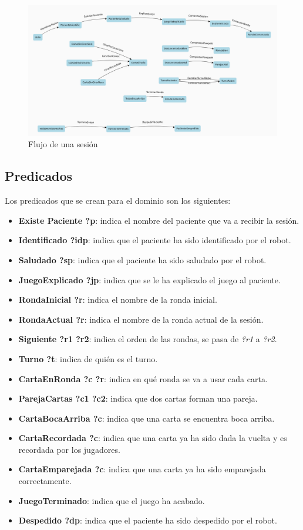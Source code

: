 \documentclass{uc3mpracticas}
\begin{document}
  \begin{figure}[!h]
    \centering
    \includegraphics[width=1.1\linewidth]{./Images/flujo.png}
    \caption*{Flujo de una sesión}
  \end{figure}



  \subsection{Predicados}

  Los predicados que se crean para el dominio son los siguientes:

  \begin{itemize}
    \item \textbf{Existe Paciente ?p}: indica el nombre del paciente que va a recibir la sesión.
    \item \textbf{Identificado ?idp}: indica que el paciente ha sido identificado por el robot.
    \item \textbf{Saludado ?sp}: indica que el paciente ha sido saludado por el robot.
    \item \textbf{JuegoExplicado ?jp}: indica que se le ha explicado el juego al paciente.
    \item \textbf{RondaInicial ?r}: indica el nombre de la ronda inicial.
    \item \textbf{RondaActual ?r}: indica el nombre de la ronda actual de la sesión.
    \item \textbf{Siguiente ?r1 ?r2}: indica el orden de las rondas, se pasa de \textit{?r1} a \textit{?r2}.
    \item \textbf{Turno ?t}: indica de quién es el turno.
    \item \textbf{CartaEnRonda ?c ?r}: indica en qué ronda se va a usar cada carta.
    \item \textbf{ParejaCartas ?c1 ?c2}: indica que dos cartas forman una pareja.
    \item \textbf{CartaBocaArriba ?c}: indica que una  carta se encuentra boca arriba.
    \item \textbf{CartaRecordada ?c}: indica que una carta ya ha sido dada la vuelta y es recordada por los jugadores.
    \item \textbf{CartaEmparejada ?c}: indica que una carta ya ha sido emparejada correctamente.
    \item \textbf{JuegoTerminado}: indica que el juego ha acabado.
    \item \textbf{Despedido ?dp}: indica que el paciente ha sido despedido por el robot.
  \end{itemize}
\end{document}
